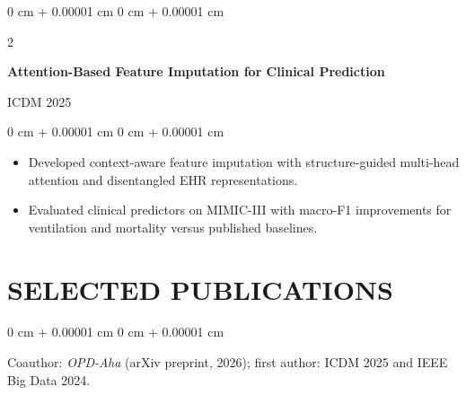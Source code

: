 \documentclass[10pt, letterpaper]{article}
\newenvironment{highlights}{
    \begin{itemize}[
        topsep=0.10 cm,
        parsep=0.10 cm,
        partopsep=0pt,
        itemsep=0pt,
        leftmargin=0 cm + 10pt
    ]
}{
    \end{itemize}
} %
\newenvironment{onecolentry}{
    \begin{adjustwidth}{
        0 cm + 0.00001 cm
    }{
        0 cm + 0.00001 cm
    }
}{
    \end{adjustwidth}
} %
\newenvironment{twocolentry}[2][]{
    \onecolentry
    \def\secondColumn{#2}
    \setcolumnwidth{\fill, 4.5 cm}
    \begin{paracol}{2}
}{
    \switchcolumn \raggedleft \secondColumn
    \end{paracol}
    \endonecolentry
} %
\begin{document}
\vspace{0.03 cm}
\begin{twocolentry}{ICDM 2025}
\textbf{Attention-Based Feature Imputation for Clinical Prediction}
\end{twocolentry}
\begin{onecolentry}
\begin{highlights}
\item Developed context-aware feature imputation with structure-guided multi-head attention and disentangled EHR representations.
\item Evaluated clinical predictors on MIMIC-III with macro-F1 improvements for ventilation and mortality versus published baselines.
\end{highlights}
\end{onecolentry}
\vspace{0.03 cm}
\section{SELECTED PUBLICATIONS}
\begin{onecolentry}
Coauthor: \textit{OPD-Aha} (arXiv preprint, 2026); first author: ICDM 2025 and IEEE Big Data 2024.
\end{onecolentry}
\end{document}

